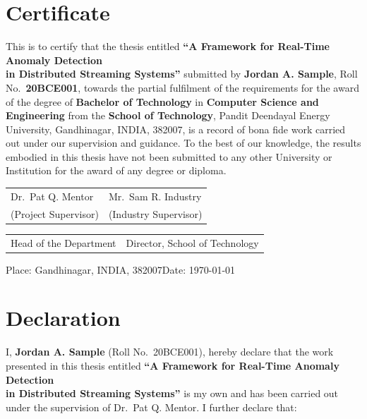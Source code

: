 \documentclass[12pt,a4paper,oneside]{report}
\newcommand{\thesisTitle}{A Framework for Real-Time Anomaly Detection\\in Distributed Streaming Systems}
\newcommand{\thesisAuthor}{Jordan A. Sample}
\newcommand{\thesisRollNo}{20BCE001}
\newcommand{\thesisGuide}{Dr.\ Pat Q. Mentor}
\newcommand{\thesisCoGuide}{Mr.\ Sam R. Industry}
\newcommand{\thesisDepartment}{Computer Science and Engineering}
\newcommand{\thesisSchool}{School of Technology}
\newcommand{\thesisUniversity}{Pandit Deendayal Energy University}
\newcommand{\thesisCity}{Gandhinagar, INDIA, 382007}
\newcommand{\thesisDegree}{Bachelor of Technology}
\begin{document}
\chapter*{Certificate}
\thispagestyle{plain}

This is to certify that the thesis entitled \textbf{``\thesisTitle''}
submitted by \textbf{\thesisAuthor}, Roll No.\ \textbf{\thesisRollNo}, towards
the partial fulfilment of the requirements for the award of the degree of
\textbf{\thesisDegree} in \textbf{\thesisDepartment} from the
\textbf{\thesisSchool}, \thesisUniversity, \thesisCity, is a record of bona
fide work carried out under our supervision and guidance. To the best of our
knowledge, the results embodied in this thesis have not been submitted to any
other University or Institution for the award of any degree or diploma.

\vspace{3cm}
\noindent
\begin{tabularx}{\textwidth}{@{}XX@{}}
  \centering \thesisGuide & \centering \thesisCoGuide \tabularnewline
  \centering (Project Supervisor) & \centering (Industry Supervisor) \tabularnewline
\end{tabularx}

\vspace{2cm}
\noindent
\begin{tabularx}{\textwidth}{@{}XX@{}}
  \centering Head of the Department & \centering Director, \thesisSchool \tabularnewline
\end{tabularx}

\vspace{1.5cm}
\noindent Place: \thesisCity \hfill Date: \today

\chapter*{Declaration}
\thispagestyle{plain}

I, \textbf{\thesisAuthor} (Roll No.\ \thesisRollNo), hereby declare that the
work presented in this thesis entitled \textbf{``\thesisTitle''} is my own and
has been carried out under the supervision of \thesisGuide. I further declare
that:
\end{document}
